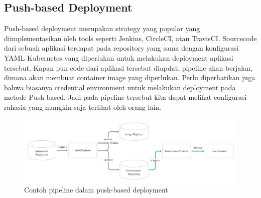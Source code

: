 \subsection{Push-based Deployment}
Push-based deployment \cite{GitOps} merupakan strategy yang popular yang diimplementasikan oleh
tools seperti Jenkins, CircleCI, atau TravisCI.
Sourcecode dari sebuah aplikasi terdapat pada repository yang sama dengan konfigurasi YAML Kubernetes yang diperlukan untuk melakukan deployment aplikasi tersebut.
Kapan pun code dari aplikasi tersebut diupdat, pipeline akan berjalan, dimana akan membuat container image yang diperlukan.
Perlu diperhatikan juga bahwa biasanya credential environment untuk melakukan deployment pada metode Push-based. Jadi pada pipeline tersebut kita dapat melihat
configurasi rahasia yang mungkin saja terlihat oleh orang lain.
\begin{figure}[ht]
    \centering
    \includegraphics[width=1\textwidth]{images/push-based.png}
    \caption{Contoh pipeline dalam push-based deployment}
\end{figure}
\newpage
\vspace{0.5cm}
